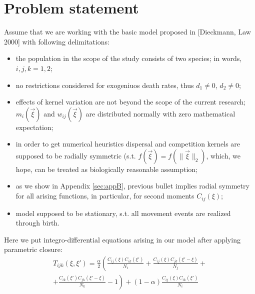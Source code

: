 \documentclass[%
 aip,
rsi,%
 amsmath,amssymb,
 reprint,%
]{revtex4-1}
\begin{document}
\maketitle %


\section{Problem statement}
\label{sec:PrSt}
Assume that we are working with the basic model proposed in [Dieckmann, Law 2000] with following delimitations:
\begin{itemize}
    \item the population in the scope of the study consists of two species; in words, \(i, j, k = 1, 2\); 
    \item no restrictions considered for exogeniuos death rates, thus \( d_1 \ne 0 \), \( d_2 \ne 0 \);
    \item effects of kernel variation are not beyond the scope of the current research; \( m_i(\vec{\xi}) \) and \(w_{ij}(\vec{\xi})\) are distributed normally with zero mathematical expectation;
    \item in order to get numerical heuristics dispersal and competition kernels are supposed to be radially symmetric (s.t. \(f(\vec{\xi})=f(\lVert \vec{\xi} \rVert_2)\), which, we hope, can be treated as biologically reasonable assumption; 
    \item as we show in Appendix \ref{sec:appB}, previous bullet implies radial symmetry for all arising functions, in particular, for second moments \(C_{ij}(\xi) \);
    \item model supposed to be stationary, s.t. all movement events are realized through birth.
\end{itemize}
Here we put integro-differential equations arising in our model after
applying parametric closure:
\begin{multline*}
T_{ijk}(\xi,\xi') = \frac{\alpha}{2}\left(\frac{C_{ij}(\xi)C_{ik}(\xi')}{N_{i}}+\frac{C_{ij}(\xi)C_{jk}(\xi'-\xi)}{N_{j}}+\right.\\
  \left.+\frac{C_{ik}(\xi')C_{jk}(\xi'-\xi)}{N_{k}}-1\right)+(1-\alpha)\frac{C_{ij}(\xi)C_{ik}(\xi')}{N_{i}}
\end{multline*}
\end{document}
